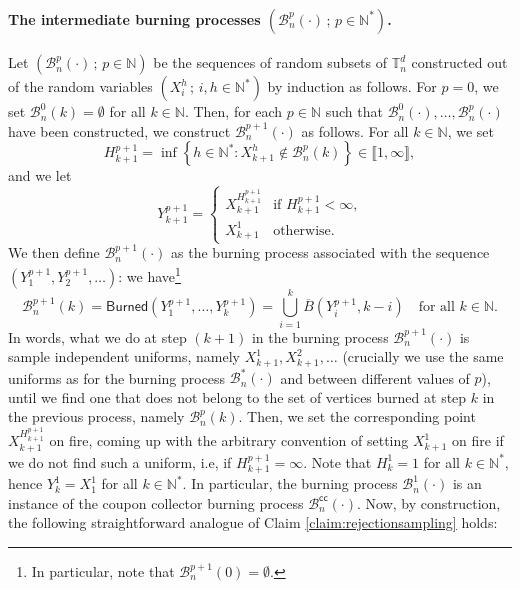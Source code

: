 \documentclass[a4paper,11pt]{article}
\begin{document}
\paragraph{The intermediate burning processes $\left(\mathcal{B}_n^p(\cdot)\,;\,p\in\mathbb{N}^*\right)$.}
Let $\left(\mathcal{B}_n^p(\cdot)\,;\,p\in\mathbb{N}\right)$ be the sequences of random subsets of $\mathbb{T}_n^d$ constructed out of the random variables $\left(X_i^h\,;\,i,h\in\mathbb{N}^*\right)$ by induction as follows.
For ${p=0}$, we set $\mathcal{B}_n^0(k)=\emptyset$ for all $k\in\mathbb{N}$.
Then, for each $p\in\mathbb{N}$ such that $\mathcal{B}_n^0(\cdot),\ldots,\mathcal{B}_n^p(\cdot)$ have been constructed, we construct $\mathcal{B}_n^{p+1}(\cdot)$ as follows.
For all $k\in\mathbb{N}$, we set
\[H_{k+1}^{p+1}=\inf\left\{h\in\mathbb{N}^*:X_{k+1}^h\notin\mathcal{B}_n^p(k)\right\}\in\llbracket1,\infty\rrbracket,\]
and we let
\[Y_{k+1}^{p+1}=\begin{cases}
X_{k+1}^{H_{k+1}^{p+1}}&\text{if $H_{k+1}^{p+1}<\infty$,}\\
X_{k+1}^1&\text{otherwise.}
\end{cases}\]
We then define $\mathcal{B}_n^{p+1}(\cdot)$ as the burning process associated with the sequence $\left(Y_1^{p+1},Y_2^{p+1},\ldots\right)$: we have\footnote{In particular, note that $\mathcal{B}_n^{p+1}(0)=\emptyset$.}
\[\mathcal{B}_n^{p+1}(k)=\mathsf{Burned}\left(Y_1^{p+1},\ldots,Y_k^{p+1}\right)=\bigcup_{i=1}^k\overline{B}\left(Y_i^{p+1},k-i\right)\quad\text{for all $k\in\mathbb{N}$.}\]
In words, what we do at step $(k+1)$ in the burning process $\mathcal{B}_n^{p+1}(\cdot)$ is sample independent uniforms, namely $X_{k+1}^1,X_{k+1}^2,\ldots$ (crucially we use the same uniforms as for the burning process $\mathcal{B}_n^*(\cdot)$ and between different values of $p$), until we find one that does not belong to the set of vertices burned at step $k$ in the previous process, namely $\mathcal{B}_n^p(k)$.
Then, we set the corresponding point $X_{k+1}^{H_{k+1}^{p+1}}$ on fire, coming up with the arbitrary convention of setting $X_{k+1}^1$ on fire if we do not find such a uniform, i.e, if $H_{k+1}^{p+1}=\infty$.
Note that $H^1_k=1$ for all $k\in\mathbb{N}^*$, hence $Y^1_k=X_1^1$ for all $k\in\mathbb{N}^*$.
In particular, the burning process $\mathcal{B}_n^1(\cdot)$ is an instance of the coupon collector burning process $\mathcal{B}_n^\mathsf{cc}(\cdot)$.
Now, by construction, the following straightforward analogue of Claim \ref{claim:rejectionsampling} holds:
\end{document}

